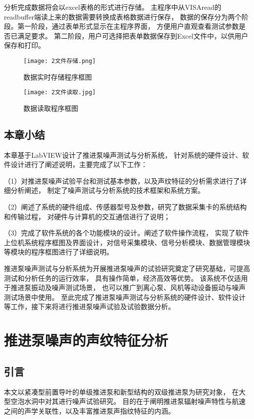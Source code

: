 分析完成数据将会以excel表格的形式进行存储。
主程序中从VISAread的readbuffer端读上来的数据需要转换成表格数据进行保存，
数据的保存分为两个阶段。第一阶段，通过表单形式显示在主程序界面，
方便用户直观查看测试参数是否已满足要求。
第二阶段，用户可选择把表单数据保存到Excel文件中，以供用户保存和打印。
\begin{figure}[htbp]
    \centering
    \texttt{[image: 2文件存储.png]}
    \caption{\label{fig:save}数据实时存储程序框图}
\end{figure}
\begin{figure}[htbp]
    \centering
    \texttt{[image: 2文件读取.jpg]}
    \caption{\label{fig:read}数据读取程序框图}
\end{figure}
\section{本章小结}
本章基于LabVIEW设计了推进泵噪声测试与分析系统，
针对系统的硬件设计、软件设计进行了阐述说明，主要完成了以下工作：

（1）对推进泵噪声试验平台和测试基本参数，以及声纹特征的分析需求进行了详细分析阐述，
制定了噪声测试与分析系统的技术框架和系统方案。

（2）阐述了系统的硬件组成、传感器型号及参数，研究了数据采集卡的系统结构和传输过程，
对硬件与计算机的交互通信进行了说明；

（3）完成了软件系统的各个功能模块的设计。阐述了软件操作流程，
实现了软件上位机系统程序框图及界面设计，对信号采集模块、信号分析模块、数据管理模块等模块的程序框图进行了详细说明。

推进泵噪声测试与分析系统为开展推进泵噪声的试验研究奠定了研究基础，可提高测试和分析任务的运行效率，
具有操作简单，经济高效等优势。
该系统不仅适用于推进泵振动及噪声测试场景，
也可以推广到离心泵、风机等动设备振动与噪声测试场景中使用。
至此完成了推进泵噪声测试与分析系统的硬件设计、软件设计等工作，接下来将进行推进泵噪声试验及试验数据分析。

\chapter{推进泵噪声的声纹特征分析}\label{ch:chapter3}
\section{引言}
本文以紧凑型前置导叶的单级推进泵和新型结构的双级推进泵为研究对象，
在大型空泡水洞中对其进行噪声试验研究。
目的在于阐明推进泵辐射噪声特性与航速之间的声学关联性，以及丰富推进泵声指纹特征的内涵。

